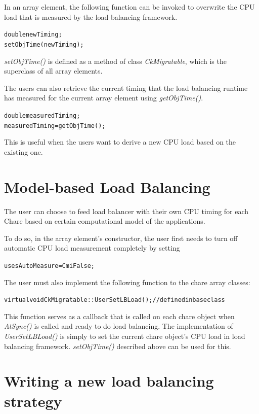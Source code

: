 In an array element, the following function can be invoked to overwrite the 
CPU load that is measured by the load balancing framework.

\begin{alltt}
   double newTiming;
   setObjTime(newTiming);
\end{alltt}

{\em setObjTime()} is defined as a method of class {\em CkMigratable}, which is
the superclass of all array elements.

The users can also retrieve the current timing that the load balancing runtime
has measured for the current array element using {\em getObjTime()}. 
 
\begin{alltt} 
   double measuredTiming; 
   measuredTiming = getObjTime(); 
\end{alltt}

This is useful when the users want to derive a new CPU load based on the 
existing one.

\section{Model-based Load Balancing}

The user can choose to feed load balancer with their own CPU
timing for each Chare based on certain computational model of the applications.

To do so, in the array element's constructor, the user first needs to turn off 
automatic CPU load measurement completely by setting

\begin{alltt}
   usesAutoMeasure = CmiFalse;
\end{alltt}

The user must also implement the following function to the chare array
classes:

\begin{alltt}
   virtual void CkMigratable::UserSetLBLoad();      // defined in base class
\end{alltt}

This function serves as a callback that is called on each chare object when
{\em AtSync()} is called and ready to do load balancing. The implementation of
{\em UserSetLBLoad()} is simply to set the current chare object's CPU load in
load balancing framework. {\em setObjTime()} described above can be used for
this.

\section{Writing a new load balancing strategy}

